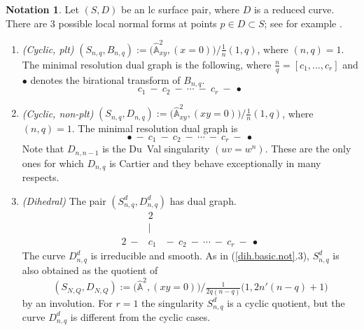\documentclass{amsart}
\theoremstyle{definition}
\newtheorem{notation}[thm]{Notation}
\theoremstyle{remark}
\renewcommand{\a}[0]{\hat{\mathbb A}}
\begin{document}
\begin{notation} \label{conormal.notation}
  Let  $(S, D)$ be an lc surface pair, where $D$ is a reduced curve.
 There are 3 possible local normal forms at points  $p\in D\subset S$; see for example \cite[Sec.3.3]{kk-singbook}. 
\begin{enumerate}
\item   {\it (Cyclic, plt)}
  $(S_{n,q}, B_{n,q}):=\bigl(\a^2_{xy}, (x=0)\bigr)/\tfrac1{n}(1,q)$, where $(n,q)=1$.  The minimal resolution dual graph is the following, where $\frac{n}{q}=[c_1,\dots, c_r]$ and $\bullet$ denotes the birational transform of $B_{n,q}$. 
  $$
  c_1  \ - \ c_2  \ - \ \cdots  \ - \  c_r \ - \ \bullet
     $$
\item
   {\it (Cyclic, non-plt)}
   $(S_{n,q}, D_{n,q}):=\bigl(\a^2_{xy}, (xy=0)\bigr)/\tfrac1{n}(1,q)$, where $(n,q)=1$.
     The minimal resolution dual graph is
   $$
  \bullet \ - \  c_1  \ - \ c_2  \ - \ \cdots  \ - \  c_r \ - \ \bullet
  $$
  Note that $D_{n,n{-}1}$ is the Du~Val singularity  $(uv=w^n)$. These are the only ones for which $D_{n,q}$ is Cartier and they behave exceptionally in many respects.
\item
  {\it (Dihedral)}  The pair  $(S^d_{n,q}, D^d_{n,q})$ has dual graph.
  $$
  \begin{array}{ccc}
    & 2 &\\
     & | &\\
    2  \ - \!\!\!\!   &c_1& \!\!\!\!   - \ c_2  \ - \ \cdots  \ - \  c_r  \ - \ \bullet
  \end{array}
$$
The curve $D^d_{n,q}$ is irreducible and smooth.
As in (\ref{dih.basic.not}.3), $S^d_{n,q}$  is also obtained as the quotient of
$$
(S_{N,Q}, D_{N,Q}):=\bigl(\a^2, (xy=0)\bigr)/\tfrac1{2q(n-q)}\bigl(1, 2n'(n-q)+1\bigr)
$$
by an involution.
For $r=1$   the singularity $S^d_{n,q}$ is a cyclic quotient, but the curve $D^d_{n,q}$ is different from the cyclic cases.
 \end{enumerate}
\end{notation}
\end{document}
